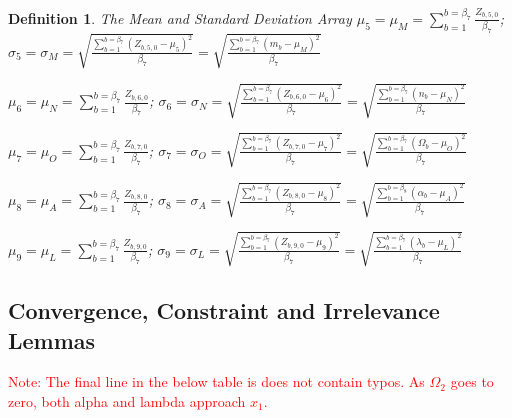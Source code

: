 \documentclass[preprint,13pt]{elsarticle}
\newtheorem{definition}{Definition}[section]
\begin{document}
\begin{definition}{The Mean and Standard Deviation Array}
$\mu_{5}=\mu_{M}=\sum_{b=1}^{b=\beta_{7}}\frac{Z_{b,5,0}}{\beta_{7}}$; $\sigma_{5}=\sigma_{M}=\sqrt{\frac{\sum_{b=1}^{b=\beta_{7}}(Z_{b,5,0}-\mu_{5})^2}{\beta_{7}}}=\sqrt{\frac{\sum_{b=1}^{b=\beta_{7}}(m_{b}-\mu_{M})^2}{\beta_{7}}}$

$\mu_{6}=\mu_{N}=\sum_{b=1}^{b=\beta_{7}}\frac{Z_{b,6,0}}{\beta_{7}}$; $\sigma_{6}=\sigma_{N}=\sqrt{\frac{\sum_{b=1}^{b=\beta_{7}}(Z_{b,6,0}-\mu_{6})^2}{\beta_{7}}}=\sqrt{\frac{\sum_{b=1}^{b=\beta_{7}}(n_{b}-\mu_{N})^2}{\beta_{7}}}$

$\mu_{7}=\mu_{O}=\sum_{b=1}^{b=\beta_{7}}\frac{Z_{b,7,0}}{\beta_{7}}$; $\sigma_{7}=\sigma_{O}=\sqrt{\frac{\sum_{b=1}^{b=\beta_{7}}(Z_{b,7,0}-\mu_{7})^2}{\beta_{7}}}=\sqrt{\frac{\sum_{b=1}^{b=\beta_{7}}(\Omega_{b}-\mu_{O})^2}{\beta_{7}}}$

$\mu_{8}=\mu_{A}=\sum_{b=1}^{b=\beta_{7}}\frac{Z_{b,8,0}}{\beta_{7}}$; $\sigma_{8}=\sigma_{A}=\sqrt{\frac{\sum_{b=1}^{b=\beta_{7}}(Z_{b,8,0}-\mu_{8})^2}{\beta_{7}}}=\sqrt{\frac{\sum_{b=1}^{b=\beta_{8}}(\alpha_{b}-\mu_{A})^2}{\beta_{7}}}$

$\mu_{9}=\mu_{L}=\sum_{b=1}^{b=\beta_{7}}\frac{Z_{b,9,0}}{\beta_{7}}$; $\sigma_{9}=\sigma_{L}=\sqrt{\frac{\sum_{b=1}^{b=\beta_{7}}(Z_{b,9,0}-\mu_{9})^2}{\beta_{7}}}=\sqrt{\frac{\sum_{b=1}^{b=\beta_{7}}(\lambda_{b}-\mu_{L})^2}{\beta_{7}}}$
\end{definition}
\newpage
\subsection{Convergence, Constraint and Irrelevance Lemmas}
\textcolor{red}{Note: The final line in the below table is does not contain typos. As $\Omega_{2}$ goes to zero, both alpha and lambda approach $x_{1}$.}
\end{document}
